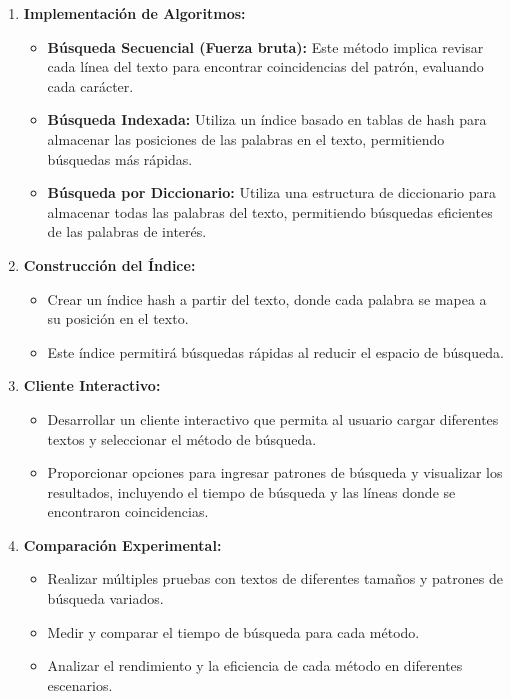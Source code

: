 \documentclass[12pt, twoside]{article}
\begin{document}
\begin{enumerate}
    \item \textbf{Implementación de Algoritmos:}
        \begin{itemize}
            \item \textbf{Búsqueda Secuencial (Fuerza bruta):} Este método implica revisar cada línea del texto para encontrar coincidencias del patrón, evaluando cada carácter.
            \item \textbf{Búsqueda Indexada:} Utiliza un índice basado en tablas de hash para almacenar las posiciones de las palabras en el texto, permitiendo búsquedas más rápidas.
            \item \textbf{Búsqueda por Diccionario:} Utiliza una estructura de diccionario para almacenar todas las palabras del texto, permitiendo búsquedas eficientes de las palabras de interés.
        \end{itemize}
    \item \textbf{Construcción del Índice:}
        \begin{itemize}
            \item Crear un índice hash a partir del texto, donde cada palabra se mapea a su posición en el texto.
            \item Este índice permitirá búsquedas rápidas al reducir el espacio de búsqueda.
        \end{itemize}
    \item \textbf{Cliente Interactivo:}
        \begin{itemize}
            \item Desarrollar un cliente interactivo que permita al usuario cargar diferentes textos y seleccionar el método de búsqueda.
            \item Proporcionar opciones para ingresar patrones de búsqueda y visualizar los resultados, incluyendo el tiempo de búsqueda y las líneas donde se encontraron coincidencias.
        \end{itemize}
    \item \textbf{Comparación Experimental:}
        \begin{itemize}
            \item Realizar múltiples pruebas con textos de diferentes tamaños y patrones de búsqueda variados.
            \item Medir y comparar el tiempo de búsqueda para cada método.
            \item Analizar el rendimiento y la eficiencia de cada método en diferentes escenarios.
        \end{itemize}
\end{enumerate}
\newpage
\end{document}
